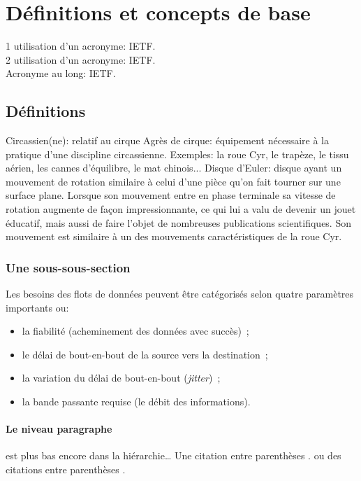 \section{Définitions et concepts de base}  %
\begin{flushleft}

1\iere{} utilisation d'un acronyme: \ac{IETF}.\\
2\ieme{} utilisation d'un acronyme: \ac{IETF}.\\
Acronyme au long: \acl{IETF}.\\
\end{flushleft}

\usepackage{gensymb}

\subsection{Définitions}
Circassien(ne): relatif au cirque
Agrès de cirque: équipement nécessaire à la pratique d'une discipline circassienne. Exemples: la roue Cyr, le trapèze, le tissu aérien, les cannes d'équilibre, le mat chinois...
Disque d'Euler: disque ayant un mouvement de rotation similaire à celui d'une pièce qu'on fait tourner sur une surface plane. Lorsque son mouvement entre en phase terminale sa vitesse de rotation augmente de façon impressionnante, ce qui lui a valu de devenir un jouet éducatif, mais aussi de faire l'objet de nombreuses publications scientifiques. Son mouvement est similaire à un des mouvements caractéristiques de la roue Cyr.

\subsubsection{Une sous-sous-section}
Les besoins des flots de données peuvent être catégorisés selon
quatre paramètres importants \cite{Fraas2010} ou:
\begin{itemize}
\item la fiabilité (acheminement des données avec succès)~;
\item le délai de \mbox{bout-en-bout} de la source vers la destination~;
\item la variation du délai de \mbox{bout-en-bout} (\emph{jitter})~;
\item la bande passante requise (le débit des informations).
\end{itemize}

\paragraph{Le niveau paragraphe} est plus bas encore dans la hiérarchie\ldots
Une citation entre parenthèses \cite{Chen2009}.
ou des citations entre parenthèses \cite{Haist2014,Senjian2015,Madani2010}.

